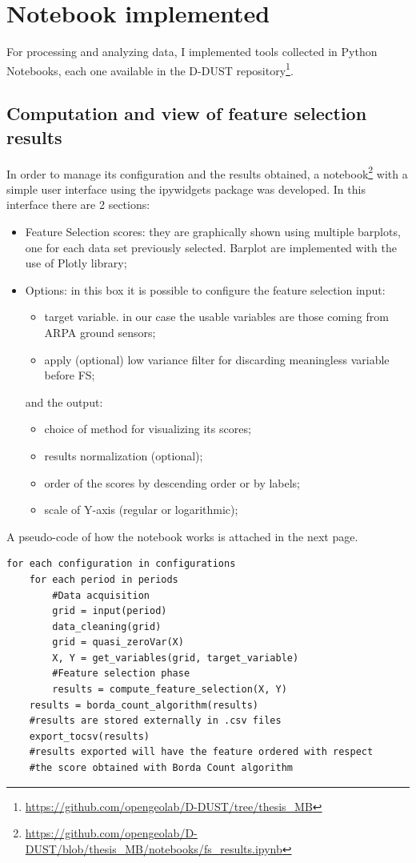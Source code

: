 \section{Notebook implemented}
For processing and analyzing data, I implemented tools collected in Python Notebooks, each one available in the D-DUST repository\footnote{\url{https://github.com/opengeolab/D-DUST/tree/thesis_MB}}.\newline

\subsection{Computation and view of feature selection results}
In order to manage its configuration and the results obtained, a notebook\footnote{\url{https://github.com/opengeolab/D-DUST/blob/thesis_MB/notebooks/fs_results.ipynb}} with a simple user interface using the ipywidgets package was developed.
In this interface there are 2 sections:
\begin{itemize}
\item Feature Selection scores: they are graphically shown using multiple barplots, one for each data set previously selected. Barplot are implemented with the use of Plotly library; 
\item Options: in this box it is possible to configure the feature selection input:
\begin{itemize}
\item target variable. in our case the usable variables are those coming from ARPA ground sensors;
\item apply (optional) low variance filter for discarding meaningless variable before FS;
\end{itemize}
and the output:
\begin{itemize}
\item choice of method for visualizing its scores;
\item results normalization (optional);
\item order of the scores by descending order or by labels;
\item scale of Y-axis (regular or logarithmic);
\end{itemize}
\end{itemize}
A pseudo-code of how the notebook works is attached in the next page.\pagebreak
\begin{verbatim}
for each configuration in configurations
    for each period in periods
        #Data acquisition
        grid = input(period)
        data_cleaning(grid)
        grid = quasi_zeroVar(X)
        X, Y = get_variables(grid, target_variable)
        #Feature selection phase
        results = compute_feature_selection(X, Y)
    results = borda_count_algorithm(results)
    #results are stored externally in .csv files
    export_tocsv(results) 
    #results exported will have the feature ordered with respect
    #the score obtained with Borda Count algorithm
\end{verbatim}

